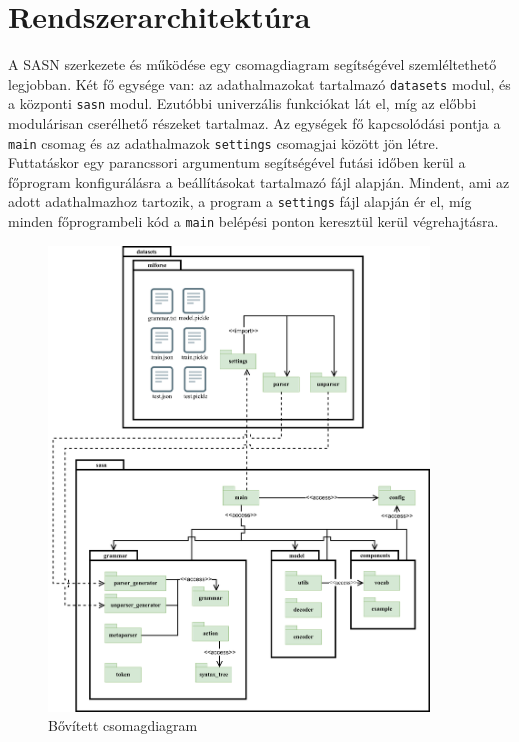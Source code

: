 \documentclass[twoside, 12pt]{report}
\newcommand{\graphicswidth}{0.9\textwidth}
\begin{document}
\section{Rendszerarchitektúra}

A SASN szerkezete és működése egy csomagdiagram segítségével szemléltethető legjobban. Két fő egysége van: az adathalmazokat tartalmazó \verb|datasets| modul, és a központi \verb|sasn| modul. Ezutóbbi univerzális funkciókat lát el, míg az előbbi modulárisan cserélhető részeket tartalmaz. Az egységek fő kapcsolódási pontja a \verb|main| csomag és az adathalmazok \verb|settings| csomagjai között jön létre. Futtatáskor egy parancssori argumentum segítségével futási időben kerül a főprogram konfigurálásra a beállításokat tartalmazó fájl alapján. Mindent, ami az adott adathalmazhoz tartozik, a program a \verb|settings| fájl alapján ér el, míg minden főprogrambeli kód a \verb|main| belépési ponton keresztül kerül végrehajtásra.

\begin{figure}[H]
  \centering
  \includegraphics[width=\graphicswidth]{csomagdiagram.png}
  \caption{Bővített csomagdiagram}
\end{figure}
\end{document}
